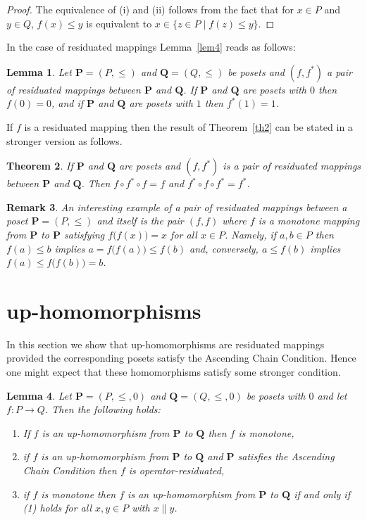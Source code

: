 \documentclass[12pt]{article}
\newtheorem{theorem}{Theorem}[section]
\newtheorem{lemma}[theorem]{Lemma}
\newtheorem{remark}[theorem]{Remark}
\begin{document}
\begin{proof}
The equivalence of (i) and (ii) follows from the fact that for $x\in P$ and $y\in Q$, $f(x)\le y$ is equivalent to $x\in\{z\in P\mid f(z)\le y\}$.
\end{proof}

In the case of residuated mappings Lemma~\ref{lem4} reads as follows:

\begin{lemma}\label{lem2}
Let $\mathbf P=(P,\le)$ and $\mathbf Q=(Q,\le)$ be posets and $(f,f^*)$ a pair of residuated mappings between $\mathbf P$ and $\mathbf Q$. If $\mathbf P$ and $\mathbf Q$ are posets with $0$ then $f(0)=0$, and if $\mathbf P$ and $\mathbf Q$ are posets with $1$ then $f^*(1)=1$.
\end{lemma}

If $f$ is a residuated mapping then the result of Theorem~\ref{th2} can be stated in a stronger version as follows.

\begin{theorem}
If $\mathbf P$ and $\mathbf Q$ are posets and $(f,f^*)$ is a pair of residuated mappings between $\mathbf P$ and $\mathbf Q$. Then $f\circ f^*\circ f=f$ and $f^*\circ f\circ f^*=f^*$.
\end{theorem}

\begin{remark}
An interesting example of a pair of residuated mappings between a poset $\mathbf P=(P,\le)$ and itself is the pair $(f,f)$ where $f$ is a monotone mapping from $\mathbf P$ to $\mathbf P$ satisfying $f\big(f(x)\big)=x$ for all $x\in P$. Namely, if $a,b\in P$ then $f(a)\le b$ implies $a=f\big(f(a)\big)\le f(b)$ and, conversely, $a\le f(b)$ implies $f(a)\le f\big(f(b)\big)=b$.
\end{remark} 	

\section{up-homomorphisms}

In this section we show that up-homomorphisms are residuated mappings provided the corresponding posets satisfy the Ascending Chain Condition. Hence one might expect that these homomorphisms satisfy some stronger condition.

\begin{lemma}\label{lem1}
Let	$\mathbf P=(P,\le,0)$ and $\mathbf Q=(Q,\le,0)$ be posets with $0$ and let $f\colon P\to Q$. Then the following holds:
\begin{enumerate}[{\rm(i)}]
\item If $f$ is an up-homomorphism from $\mathbf P$ to $\mathbf Q$ then $f$ is monotone,
\item if $f$ is an up-homomorphism from $\mathbf P$ to $\mathbf Q$ and $\mathbf P$ satisfies the Ascending Chain Condition then $f$ is operator-residuated,
\item if $f$ is monotone then $f$ is an up-homomorphism from $\mathbf P$ to $\mathbf Q$ if and only if {\rm(1)} holds for all $x,y\in P$ with $x\parallel y$.
\end{enumerate}
\end{lemma}
\end{document}
